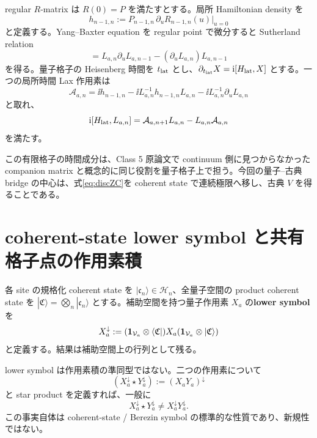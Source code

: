 regular $R$-matrix は $R(0)=P$ を満たすとする。局所 Hamiltonian density を
\begin{equation}
h_{n-1,n}:=P_{n-1,n}\,\partial_uR_{n-1,n}(u)\big|_{u=0}
\label{eq:hdef}
\end{equation}
と定義する。Yang--Baxter equation を regular point で微分すると Sutherland relation
\begin{equation}
[h_{n-1,n},L_{a,n}L_{a,n-1}]
=L_{a,n}\partial_uL_{a,n-1}-(\partial_uL_{a,n})L_{a,n-1}
\label{eq:SuthMain}
\end{equation}
を得る。量子格子の Heisenberg 時間を $t_{\rm lat}$ とし、$\partial_{t_{\rm lat}}X=\mathrm i[H_{\rm lat},X]$ とする。一つの局所時間 Lax 作用素は
\begin{equation}
\mathcal A_{a,n}=\ii h_{n-1,n}-\ii L_{a,n}^{-1}h_{n-1,n}L_{a,n}-\ii L_{a,n}^{-1}\partial_uL_{a,n}
\label{eq:Afinite}
\end{equation}
と取れ、
\begin{equation}
\mathrm i[H_{\rm lat},L_{a,n}]
=\mathcal A_{a,n+1}L_{a,n}-L_{a,n}\mathcal A_{a,n}
\label{eq:discZC}
\end{equation}
を満たす。

この有限格子の時間成分は、Class 5 原論文で continuum 側に見つからなかった companion matrix と概念的に同じ役割を量子格子上で担う。今回の量子--古典 bridge の中心は、式\eqref{eq:discZC}を coherent state で連続極限へ移し、古典 $V$ を得ることである。

\section{coherent-state lower symbol と共有格子点の作用素積}
各 site の規格化 coherent state を $|\mathfrak c_n\rangle\in\mathcal H_n$、全量子空間の product coherent state を $|\mathfrak C\rangle=\bigotimes_n|\mathfrak c_n\rangle$ とする。補助空間を持つ量子作用素 $X_a$ の\textbf{lower symbol} を
\begin{equation}
X_a^\downarrow:=(\mathbf 1_{\mathcal V_a}\otimes\langle\mathfrak C|)X_a(\mathbf 1_{\mathcal V_a}\otimes|\mathfrak C\rangle)
\label{eq:lowerMain}
\end{equation}
と定義する。結果は補助空間上の行列として残る。

lower symbol は作用素積の準同型ではない。二つの作用素について
\begin{equation}
(X_a^\downarrow\star Y_a^\downarrow):=(X_aY_a)^\downarrow
\label{eq:starMain}
\end{equation}
と star product を定義すれば、一般に
\begin{equation}
X_a^\downarrow\star Y_a^\downarrow\neq X_a^\downarrow Y_a^\downarrow.
\label{eq:nonmult}
\end{equation}
この事実自体は coherent-state / Berezin symbol の標準的な性質であり、新規性ではない\cite{SuzukiTsuchiya2017,Schlichenmaier2010}。

